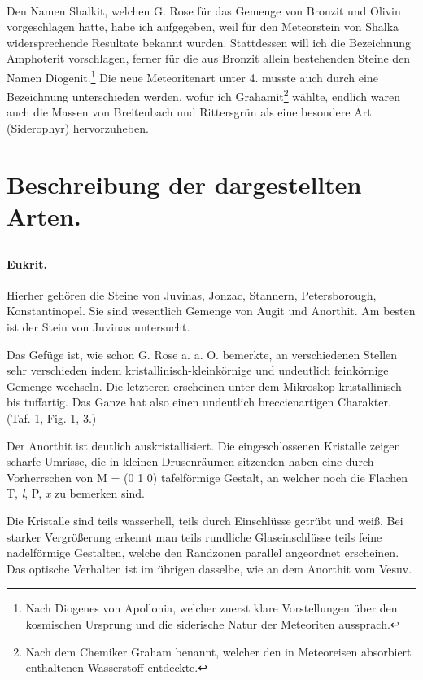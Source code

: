 \documentclass[a4paper, 12pt, oneside]{article}
\begin{document}
\paragraph*{}
Den Namen Shalkit, welchen G. Rose für das Gemenge von Bronzit und Olivin vorgeschlagen hatte, habe ich aufgegeben, weil für den Meteorstein von Shalka widersprechende Resultate bekannt wurden. Stattdessen will ich die Bezeichnung Amphoterit vorschlagen, ferner für die aus Bronzit allein bestehenden Steine den Namen Diogenit.\footnote{Nach Diogenes von Apollonia, welcher zuerst klare Vorstellungen über den kosmischen Ursprung und die siderische Natur der Meteoriten aussprach.} Die neue Meteoritenart unter 4. musste auch durch eine Bezeichnung unterschieden werden, wofür ich Grahamit\footnote{Nach dem Chemiker Graham benannt, welcher den in Meteoreisen absorbiert enthaltenen Wasserstoff entdeckte.} wählte, endlich waren auch die Massen von Breitenbach und Rittersgrün als eine besondere Art (Siderophyr) hervorzuheben.
\clearpage
\section{Beschreibung der dargestellten Arten.}
\subsection{}
\paragraph{Eukrit.} Hierher gehören die Steine von Juvinas, Jonzac, Stannern, Petersborough, Konstantinopel. Sie sind wesentlich Gemenge von Augit und Anorthit. Am besten ist der Stein von Juvinas untersucht.

Das Gefüge ist, wie schon G. Rose a. a. O. bemerkte, an verschiedenen Stellen sehr verschieden indem kristallinisch-kleinkörnige und undeutlich feinkörnige Gemenge wechseln. Die letzteren erscheinen unter dem Mikroskop kristallinisch bis tuffartig. Das Ganze hat also einen undeutlich breccienartigen Charakter. (Taf. 1, Fig. 1, 3.)

Der Anorthit ist deutlich auskristallisiert. Die eingeschlossenen Kristalle zeigen scharfe Umrisse, die in kleinen Drusenräumen sitzenden haben eine durch Vorherrschen von M = (0 1 0) tafelförmige Gestalt, an welcher noch die Flachen T, \emph{l}, P, \emph{x} zu bemerken sind.

Die Kristalle sind teils wasserhell, teils durch Einschlüsse getrübt und weiß. Bei starker Vergrößerung erkennt man teils rundliche Glaseinschlüsse teils feine nadelförmige Gestalten, welche den Randzonen parallel angeordnet erscheinen. Das optische Verhalten ist im übrigen dasselbe, wie an dem Anorthit vom Vesuv.
\end{document}
